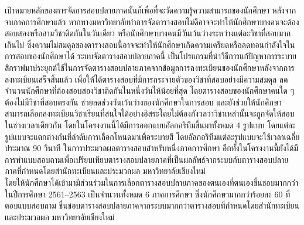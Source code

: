 \maketitle
\makesignature

\ifproject
\begin{abstractTH}
เป้าหมายหลักของการจัดการสอบปลายภาคนั้นก็เพื่อที่จะวัดความรู้ความสามารถของนักศึกษา หลังจากจบภาคการศึกษาแล้ว
หากทางมหาวิทยาลัยทำการจัดตารางสอบไม่ดีอาจจะทำให้นักศึกษาบางคนจะต้องสอบสองหรือสามวิชาติดกันในวันเดียว
หรือนักศึกษาบางคนมีวันเว้นว่างระหว่างแต่ละวิชาที่สอบมากเกินไป ซึ่งความไม่สมดุลของตารางสอบนี้อาจจะทำให้นักศึกษาเกิดความเครียดหรือลดทอนกำลังใจในการสอบของนักศึกษาได้
ระบบจัดตารางสอบปลายภาคนี้ เป็นโปรแกรมที่นำวิธีการแก้ปัญหาการระบายสีกราฟมาประยุกต์ใช้ในการจัดตารางสอบปลายภาคจากข้อมูลการลงทะเบียนของนักศึกษาหลังจากการลงทะเบียนเสร็จสิ้นแล้ว เพื่อให้ได้ตารางสอบที่มีการกระจายตัวของวิชาที่สอบอย่างมีความสมดุล
ลดจำนวนนักศึกษาที่ต้องสอบสองวิชาติดกันในหนึ่งวันให้น้อยที่สุด โดยตารางสอบของนักศึกษาคนใด ๆ ต้องไม่มีวิชาที่สอบตรงกัน ช่วยลดช่วงวันเว้นว่างของนักศึกษาในการสอบ 
และยังช่วยให้นักศึกษาสามารถเลือกลงทะเบียนวิชาเรียนที่สนใจได้อย่างอิสระโดยไม่ต้องกังวลว่าวิชาเหล่านั้นจะถูกจัดให้สอบในช่วงเวลาเดียวกัน
โดยในโครงงานนี้ได้มีการออกแบบอัลกอริทึมขึ้นมาทั้งหมด 4 รูปแบบ โดยแต่ละรูปแบบจะแตกต่างกันที่ลำดับการเลือกโหนดมาเพื่อระบายสี โดยอัลกอริทึมแต่ละรูปแบบจะใช้เวลาเฉลี่ยประมาณ 90 วินาที ในการประมวลผลตารางสอบสำหรับหนึ่งภาคการศึกษา
อีกทั้งในโครงงานนี้ยังได้มีการทำแบบสอบถามเพื่อเปรียบเทียบตารางสอบปลายภาคที่เป็นผลลัพธ์จากระบบกับตารางสอบปลายภาคที่กำหนดโดยสำนักทะเบียนและประมวลผล มหาวิทยาลัยเชียงใหม่ 
\\ โดยให้นักศึกษาได้เข้ามามีส่วนร่วมในการเลือกตารางสอบปลายภาคของตนเองที่ตนเองชื่นชอบมากกว่า ในปีการศึกษา 2561--2563 เป็นจำนวนทั้งหมด 6 ภาคการศึกษา 
ซึ่งนักศึกษามากกว่าร้อยละ 60 ที่ตอบแบบสอบถาม ชื่นชอบตารางสอบปลายภาคจากระบบมากกว่าตารางสอบที่กำหนดโดยสำนักทะเบียนและประมวลผล มหาวิทยาลัยเชียงใหม่ 
\end{abstractTH}

